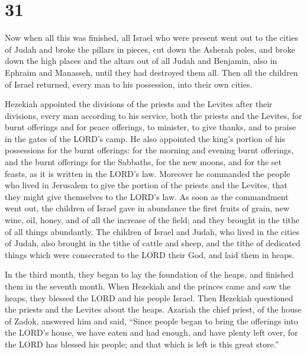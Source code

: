\hypertarget{section-30}{%
\section{31}\label{section-30}}

 Now when all this was finished, all Israel who were
present went out to the cities of Judah and broke the pillars in pieces,
cut down the Asherah poles, and broke down the high places and the
altars out of all Judah and Benjamin, also in Ephraim and Manasseh,
until they had destroyed them all. Then all the children of Israel
returned, every man to his possession, into their own cities.

 Hezekiah appointed the divisions of the priests and the
Levites after their divisions, every man according to his service, both
the priests and the Levites, for burnt offerings and for peace
offerings, to minister, to give thanks, and to praise in the gates of
the LORD's camp.  He also appointed the king's portion of
his possessions for the burnt offerings: for the morning and evening
burnt offerings, and the burnt offerings for the Sabbaths, for the new
moons, and for the set feasts, as it is written in the LORD's law.
 Moreover he commanded the people who lived in Jerusalem
to give the portion of the priests and the Levites, that they might give
themselves to the LORD's law.  As soon as the commandment
went out, the children of Israel gave in abundance the first fruits of
grain, new wine, oil, honey, and of all the increase of the field; and
they brought in the tithe of all things abundantly.  The
children of Israel and Judah, who lived in the cities of Judah, also
brought in the tithe of cattle and sheep, and the tithe of dedicated
things which were consecrated to the LORD their God, and laid them in
heaps.

 In the third month, they began to lay the foundation of
the heaps, and finished them in the seventh month.  When
Hezekiah and the princes came and saw the heaps, they blessed the LORD
and his people Israel.  Then Hezekiah questioned the
priests and the Levites about the heaps.  Azariah the
chief priest, of the house of Zadok, answered him and said, ``Since
people began to bring the offerings into the LORD's house, we have eaten
and had enough, and have plenty left over, for the LORD has blessed his
people; and that which is left is this great store.''

